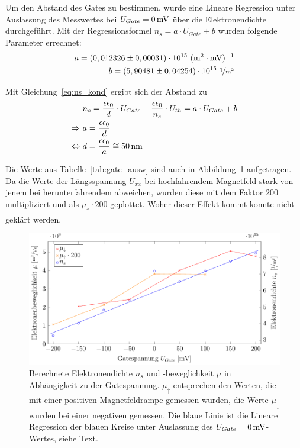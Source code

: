 Um den Abstand des Gates zu bestimmen, wurde eine Lineare Regression unter Auslassung des Messwertes bei $U_{Gate}=\unit[0]{mV}$ über die Elektronendichte durchgeführt. Mit der Regressionsformel $n_s=a\cdot U_{Gate} + b$ wurden folgende Parameter errechnet:
\begin{align}
a = ( 0,012326 \pm 0,00031)\cdot 10^{15} ~ \unit{(m^2 \cdot mV)^{-1}}\\
b=( 5,90481 \pm 0,04254 )\cdot 10^{15} ~ \unitfrac{1}{m^2}
\end{align}

Mit Gleichung~\eqref{eq:ns_kond} ergibt sich der Abstand zu
\begin{align}
& n_s=\frac{\epsilon \epsilon_0}{d}\cdot U_{Gate} - \frac{\epsilon \epsilon_0}{n_s} \cdot U_{th}= a \cdot U_{Gate} + b \\
\Rightarrow~ & a=\frac{\epsilon \epsilon_0}{d}\\
\Leftrightarrow~ & d=\frac{\epsilon \epsilon_0}{a} \cong \unit[50]{nm}
\end{align}


Die Werte aus Tabelle~\ref{tab:gate_ausw} sind auch in Abbildung~\ref{fig:gate_ausw} aufgetragen. Da die Werte der Längsspannung $U_{xx}$ bei hochfahrendem Magnetfeld stark von jenem bei herunterfahrendem abweichen, wurden diese mit dem Faktor $200$ multipliziert und als $\mu_{\uparrow}\cdot 200$ geplottet. Woher dieser Effekt kommt konnte nicht geklärt werden.

\begin{figure}[h]
	\centering
	\includegraphics[scale=1]{graphs/gate/auswertung.pdf}
	\caption[Auswertung der Gatespannungsvariation]{
		Berechnete Elektronendichte $n_s$ und -beweglichkeit $\mu$ in Abhängigkeit zu der Gatespannung. $\mu_{\uparrow}$ entsprechen den Werten, die mit einer positiven Magnetfeldrampe gemessen wurden, die Werte $\mu_{\downarrow}$ wurden bei einer negativen gemessen. Die blaue Linie ist die Lineare Regression der blauen Kreise unter Auslassung des $U_{Gate}=\unit[0]{mV}$-Wertes, siehe Text.
	}
	\label{fig:gate_ausw}
\end{figure}
